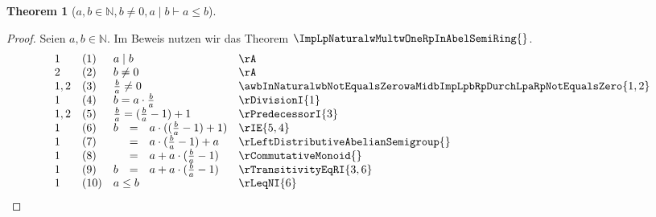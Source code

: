 \documentclass{book}
\theoremstyle{plain}
\newtheorem{theorem}{Theorem}
\theoremstyle{remark}
\theoremstyle{definition}
\begin{document}
\label{awbInNaturalwbNotEqualsZerowaMidbImpaLeqb}
\begin{theorem}[\(a,b \in\mathbb{N}, b\neq 0, a\mid b\vdash a\leq b\)]
\end{theorem}
\begin{proof}
Seien \(a,b\in\mathbb{N}\).
Im Beweis nutzen wir das Theorem \(\ImpLpNaturalwMultwOneRpInAbelSemiRing{}\). 
    \[
	\begin{array}{llclll}
    1       &  (1)  & \multicolumn{3}{l}{a\mid b} & \rA \\
    2       &  (2)  & \multicolumn{3}{l}{b\neq 0} & \rA \\
    1,2     &  (3)  & \multicolumn{3}{l}{\frac{b}{a}\neq 0} & \awbInNaturalwbNotEqualsZerowaMidbImpLpbRpDurchLpaRpNotEqualsZero{1,2} \\
    1       &  (4)  & \multicolumn{3}{l}{b=a\cdot \frac{b}{a}} & \rDivisionI{1} \\
    1,2     &  (5)  & \multicolumn{3}{l}{\frac{b}{a}=(\frac{b}{a}-1)+1} & \rPredecessorI{3} \\
    1       &  (6)  & b&=&a\cdot ((\frac{b}{a}-1)+1) & \rIE{5,4} \\
    1       &  (7)  & &=& a\cdot (\frac{b}{a}-1)+a & \rLeftDistributiveAbelianSemigroup{} \\
    1       &  (8)  & &=& a+a\cdot (\frac{b}{a}-1) & \rCommutativeMonoid{} \\
    1       &  (9)  & b &=& a+a\cdot (\frac{b}{a}-1) & \rTransitivityEqRI{3,6} \\
    1       &  (10)  &  \multicolumn{3}{l}{a\leq b} & \rLeqNI{6} \\
    \end{array}
	\]
\end{proof}
\end{document}
